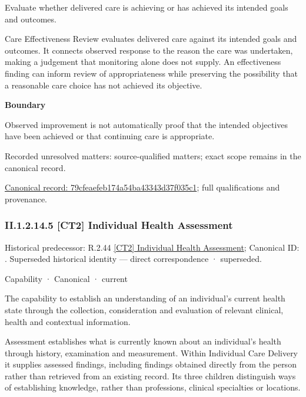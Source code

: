 Evaluate whether delivered care is achieving or has achieved its intended goals and outcomes.



Care Effectiveness Review evaluates delivered care against its intended goals and outcomes. It connects observed response to the reason the care was undertaken, making a judgement that monitoring alone does not supply. An effectiveness finding can inform review of appropriateness while preserving the possibility that a reasonable care choice has not achieved its objective.



\textbf{Boundary}



Observed improvement is not automatically proof that the intended objectives have been achieved or that continuing care is appropriate.


{\small Recorded unresolved matters: source-qualified matters; exact scope remains in the canonical record.}\par
{\footnotesize \href{../../../../continuum/strategy/capability/79cfeaefeb174a54ba43343d37f035c1.md}{Canonical record: 79cfeaefeb174a54ba43343d37f035c1}; full qualifications and provenance.}\par
\subsubsection*{II.1.2.14.5 [CT2] Individual Health Assessment}
\label{navigation:II.1.2.14.5}

{\small Historical predecessor: R.2.44 \hyperref[element:9111446aa2d045bd9acd98542b0eef1f]{[CT2] Individual Health Assessment}; Canonical ID: \texttt{}. Superseded historical identity — direct correspondence · superseded.}\par
\label{element:045f819bb3694d3c9db7f20886e2993f}
{\small Capability · Canonical · current}\par

The capability to establish an understanding of an individual's current health state through the collection, consideration and evaluation of relevant clinical, health and contextual information.



Assessment establishes what is currently known about an individual's health through history, examination and measurement. Within Individual Care Delivery it supplies assessed findings, including findings obtained directly from the person rather than retrieved from an existing record. Its three children distinguish ways of establishing knowledge, rather than professions, clinical specialties or locations.




